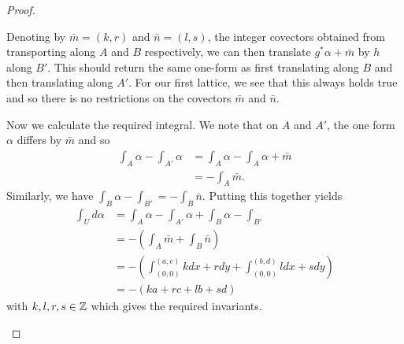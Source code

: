 \begin{proof}
\begin{case}[$\mathcal{A}_{a,b,c,d}$]
        Denoting by $\bar{m} = (k,r)$ and $\bar{n} = (l,s)$, the integer covectors
        obtained from transporting along $A$ and $B$ respectively, we can then
        translate $g^*\alpha + \bar{m}$ by $h$ along $B'$. This should return the same
        one-form as first translating along $B$ and then translating along $A'$. For
        our first lattice, we see that this always holds true and so there is no
        restrictions on the covectors $\bar{m}$ and $\bar{n}$.

        Now we calculate the required integral. We note that on $A$ and $A'$, the one
        form $\alpha$ differs by $\bar{m}$ and so
        \begin{align*}
            \int_A \alpha - \int_{A'} \alpha & = \int_A \alpha  - \int_A \alpha  + \bar{m} \\
                                             & = - \int_A \bar{m}.
        \end{align*}
        Similarly, we have $\int_B \alpha - \int_{B'} = -\int_B \bar{n}$. Putting this together yields
        \begin{align*}
            \int_{U} d\alpha & = \int_A \alpha - \int_{A'} \alpha + \int_B \alpha - \int_{B'}                   \\
                             & = -\left(\int_A \bar{m} + \int_B \bar{n}\right)                                  \\
                             & = - \left(\int_{(0,0)}^{(a,c)} kdx + rdy + \int_{(0,0)}^{(b,d)} ldx + sdy\right) \\
                             & = -(ka + rc + lb + sd)
        \end{align*}
        with $k,l,r,s \in \mathbb{Z}$ which gives the required invariants.
    \end{case}


\end{proof}
